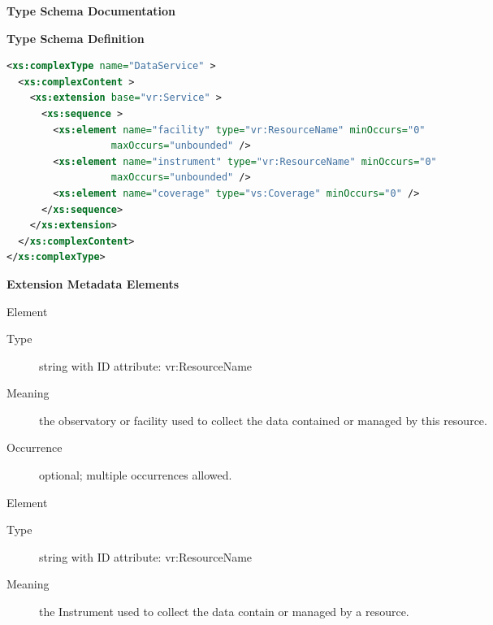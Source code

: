 \documentclass[11pt,a4paper]{ivoa}
\begin{document}
\begin{generated}
\begingroup
      	\renewcommand*\descriptionlabel[1]{%
      	\hbox to 5.5em{\emph{#1}\hfil}}\vspace{2ex}\noindent\textbf{ Type Schema Documentation}


\vspace{1ex}\noindent\textbf{ Type Schema Definition}

\begin{lstlisting}[language=XML,basicstyle=\footnotesize]
<xs:complexType name="DataService" >
  <xs:complexContent >
    <xs:extension base="vr:Service" >
      <xs:sequence >
        <xs:element name="facility" type="vr:ResourceName" minOccurs="0"
                  maxOccurs="unbounded" />
        <xs:element name="instrument" type="vr:ResourceName" minOccurs="0"
                  maxOccurs="unbounded" />
        <xs:element name="coverage" type="vs:Coverage" minOccurs="0" />
      </xs:sequence>
    </xs:extension>
  </xs:complexContent>
</xs:complexType>
\end{lstlisting}

\vspace{0.5ex}\noindent\textbf{ Extension Metadata Elements}

\begingroup\small\begin{bigdescription}\item[Element \xmlel{facility}]
\begin{description}
\item[Type] string with ID attribute: vr:ResourceName
\item[Meaning] 
                     the observatory or facility used to collect the data 
                     contained or managed by this resource.  
                   
\item[Occurrence] optional; multiple occurrences allowed.

\end{description}
\item[Element \xmlel{instrument}]
\begin{description}
\item[Type] string with ID attribute: vr:ResourceName
\item[Meaning] 
                     the Instrument used to collect the data contain or 
                     managed by a resource.  
                   

\end{description}
\end{bigdescription}
\end{generated}
\end{document}
